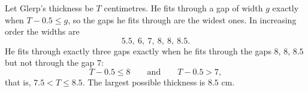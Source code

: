 Let Glerp's thickness be $T$ centimetres. He fits through a gap of width $g$ exactly when $T-0.5\le g$, so the gaps he fits through are the widest ones. In increasing order the widths are
\[5.5,\ 6,\ 7,\ 8,\ 8,\ 8.5.\]
He fits through exactly three gaps exactly when he fits through the gaps $8$, $8$, $8.5$ but not through the gap $7$:
\[T-0.5\le8\qquad\text{and}\qquad T-0.5>7,\]
that is, $7.5<T\le8.5$. The largest possible thickness is $\boxed{8.5\text{ cm}}$.
